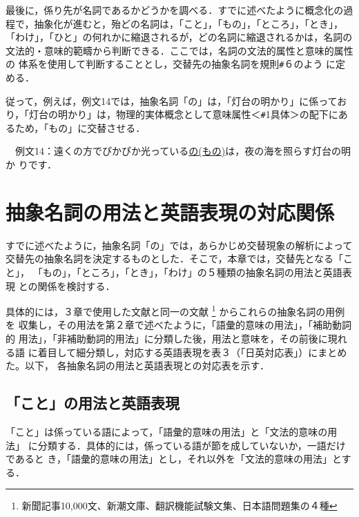 最後に，係り先が名詞であるかどうかを調べる．すでに述べたように概念化の過
程で，抽象化が進むと，殆どの名詞は，「こと」，「もの」，「ところ」，「とき」，
「わけ」，「ひと」の何れかに縮退されるが，どの名詞に縮退されるかは，名詞の
文法的・意味的範疇から判断できる．ここでは，名詞の文法的属性と意味的属性の
体系を使用して判断することとし，交替先の抽象名詞を規則{\verb+#+}６のよう
に定める．

従って，例えば，例文14では，抽象名詞「の」は，「灯台の明かり」に係ってお
り，「灯台の明かり」は，物理的実体概念として意味属性＜{\verb+#+}1具体＞の配下にあ
るため，「もの」に交替させる．

\vspace{6pt}

　例文14：遠くの方でぴかぴか光っている\underline{の(もの)}は，夜の海を照らす灯台の明か
りです．


\section{抽象名詞の用法と英語表現の対応関係}

すでに述べたように，抽象名詞「の」では，あらかじめ交替現象の解析によって
交替先の抽象名詞を決定するものとした．そこで，本章では，交替先となる「こと」，
「もの」，「ところ」，「とき」，「わけ」の５種類の抽象名詞の用法と英語表現
との関係を検討する．

具体的には，３章で使用した文献と同一の文献
\footnote{新聞記事10,000文、新潮文庫、翻訳機能試験文集、日本語問題集の４種
}
からこれらの抽象名詞の用例を
収集し，その用法を第２章で述べたように，「語彙的意味の用法」，「補助動詞的
用法」，「非補助動詞的用法」に分類した後，用法と意味を，その前後に現れる語
に着目して細分類し，対応する英語表現を表３（「日英対応表」）にまとめた。以下，
各抽象名詞の用法と英語表現との対応表を示す．

\subsection{「こと」の用法と英語表現}

「こと」は係っている語によって，「語彙的意味の用法」と「文法的意味の用法」
に分類する．具体的には，係っている語が節を成していないか，一語だけであると
き，「語彙的意味の用法」とし，それ以外を「文法的意味の用法」とする．

